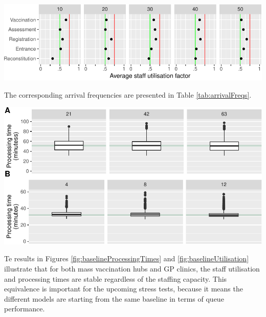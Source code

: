 \documentclass{article}
\let\origfigure\figure
\let\endorigfigure\endfigure
\renewenvironment{figure}[1][2] {
    \expandafter\origfigure\expandafter[H]
} {
    \endorigfigure
}
\begin{document}
\begin{figure}

{\centering \includegraphics{Preprint_files/figure-latex/baselineUtilisation-1} 

}

\caption{Baseline staff utilisation factor for mass vaccination hubs (A) and GP vaccination clinics (B)}\label{fig:baselineUtilisation}
\end{figure}

The corresponding arrival frequencies are presented in Table
\ref{tab:arrivalFreqs}.

\begin{figure}

{\centering \includegraphics{Preprint_files/figure-latex/baselineProcessingTimes-1} 

}

\caption{Baseline processing times for the mass vaccination hub (A) and GP vaccination clinic (B)}\label{fig:baselineProcessingTimes}
\end{figure}

Te results in Figures \ref{fig:baselineProcessingTimes} and
\ref{fig:baselineUtilisation} illustrate that for both mass vaccination
hubs and GP clinics, the staff utilisation and processing times are
stable regardless of the staffing capacity. This equivalence is
important for the upcoming stress tests, because it means the different
models are starting from the same baseline in terms of queue
performance.
\end{document}
